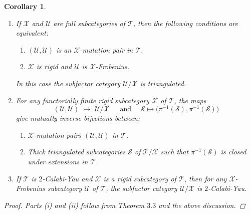 \documentclass[oneside, a4paper,reqno]{amsart}
\numberwithin{equation}{section}
\newtheorem{cor}[thm]{Corollary}
\theoremstyle{definition}
\begin{document}
\begin{cor} \begin{enumerate}
\item If ${\mathcal X}$ and  ${\mathcal U}$ are full subcategories of ${\mathcal T}$, then the following conditions are equivalent:
\begin{enumerate}
\item $({\mathcal U},{\mathcal U})$ is an ${\mathcal X}$-mutation pair in ${\mathcal T}$.
\item ${\mathcal X}$ is rigid and  ${\mathcal U}$ is ${\mathcal X}$-Frobenius.
\end{enumerate}
 In this case the subfactor category ${\mathcal U}/{\mathcal X}$ is triangulated.  
\item For any functorially finite rigid subcategory ${\mathcal X}$ of ${\mathcal T}$,  the maps 
\[
({\mathcal U},{\mathcal U}) \,\, \longmapsto \,\, {\mathcal U}/{\mathcal X} \,\,\,\,\,\,\,\,\, \text{and} \,\,\,\,\,\,\,\, \mathcal S \longmapsto   \big(\pi^{-1}(\mathcal S),\pi^{-1}(\mathcal S)\big)
\]
give mutually inverse bijections between:
\begin{enumerate}
\item[$\mathsf{(I)}$] ${\mathcal X}$-mutation pairs $({\mathcal U},{\mathcal U})$ in ${\mathcal T}$.
\item[$\mathsf{(II)}$] Thick triangulated subcategories $\mathcal S$ of ${\mathcal T}/{\mathcal X}$ such that $\pi^{-1}(\mathcal S)$ is closed under extensions in ${\mathcal T}$.   
\end{enumerate} 
\item If ${\mathcal T}$ is $2$-Calabi-Yau and ${\mathcal X}$ is a rigid subcategory of ${\mathcal T}$, then for any  ${\mathcal X}$-Frobenius subcategory ${\mathcal U}$ of ${\mathcal T}$, the subfactor category ${\mathcal U}/{\mathcal X}$ is $2$-Calabi-Yau. 
\end{enumerate}
\begin{proof} Parts (i) and  (ii) follow from Theorem $3.3$ and the above discussion.


\end{proof}
\end{cor}
\end{document}
